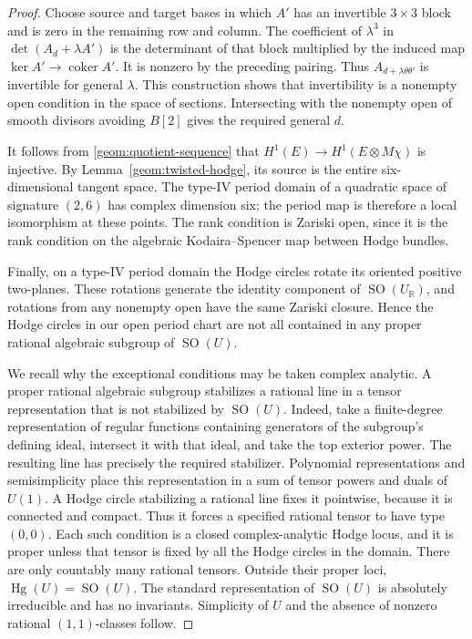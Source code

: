 \documentclass[11pt]{amsart}
\newcommand{\R}{\mathbb R}
\DeclareMathOperator{\Hg}{Hg}
\DeclareMathOperator{\SO}{SO}
\DeclareMathOperator{\coker}{coker}
\theoremstyle{definition}
\theoremstyle{remark}
\numberwithin{equation}{section}
\begin{document}
\begin{proof}
Choose source and target bases in which $A'$ has an invertible
$3\times3$ block and is zero in the remaining row and column.
The coefficient of $\lambda^3$ in $\det(A_d+\lambda A')$ is the
determinant of that block multiplied by the induced map
$\ker A'\to\coker A'$.  It is nonzero by the preceding pairing.
Thus $A_{d+\lambda\theta\theta'}$ is invertible for general
$\lambda$.  This construction shows that invertibility is a
nonempty open condition in the space of sections.  Intersecting
with the nonempty open of smooth divisors avoiding $B[2]$ gives
the required general $d$.

It follows from \eqref{geom:quotient-sequence} that
$H^1(E)\to H^1(E\otimes M\chi)$ is injective.  By
Lemma~\ref{geom:twisted-hodge}, its source is the entire
six-dimensional tangent space.  The type-IV period domain of a
quadratic space of signature $(2,6)$ has complex dimension six;
the period map is therefore a local isomorphism at these points.
The rank condition is Zariski open, since it is the rank condition
on the algebraic Kodaira--Spencer map between Hodge bundles.

Finally, on a type-IV period domain the Hodge circles rotate its
oriented positive two-planes.  These rotations generate the
identity component of $\SO(U_\R)$, and rotations from any nonempty
open have the same Zariski closure.  Hence the Hodge circles in our
open period chart are not all contained in any proper rational
algebraic subgroup of $\SO(U)$.

We recall why the exceptional conditions may be taken complex
analytic.  A proper rational algebraic subgroup stabilizes a
rational line in a tensor representation that is not stabilized by
$\SO(U)$.  Indeed, take a finite-degree representation of regular
functions containing generators of the subgroup's defining ideal,
intersect it with that ideal, and take the top exterior power.
The resulting line has precisely the required stabilizer.
Polynomial representations and semisimplicity place this
representation in a sum of tensor powers and duals of $U(1)$.
A Hodge circle stabilizing a rational line fixes
it pointwise, because it is connected and compact.  Thus it forces
a specified rational tensor to have type $(0,0)$.  Each such
condition is a closed complex-analytic Hodge locus, and it is
proper unless that tensor is fixed by all the Hodge circles in
the domain.  There are only countably many rational tensors.
Outside their proper loci, $\Hg(U)=\SO(U)$.  The standard
representation of $\SO(U)$ is absolutely irreducible and has no
invariants.  Simplicity of $U$ and the absence of nonzero rational
$(1,1)$-classes follow.
\end{proof}
\end{document}
